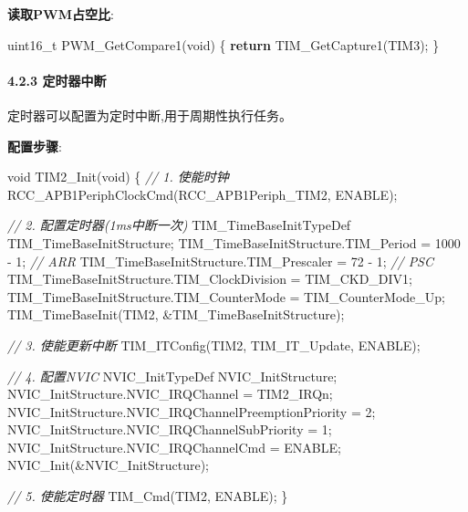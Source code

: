 \documentclass[
]{article}
\newenvironment{Shaded}{}{}
\newcommand{\CommentTok}[1]{\textcolor[rgb]{0.38,0.63,0.69}{\textit{#1}}}
\newcommand{\ControlFlowTok}[1]{\textcolor[rgb]{0.00,0.44,0.13}{\textbf{#1}}}
\newcommand{\DataTypeTok}[1]{\textcolor[rgb]{0.56,0.13,0.00}{#1}}
\newcommand{\DecValTok}[1]{\textcolor[rgb]{0.25,0.63,0.44}{#1}}
\newcommand{\NormalTok}[1]{#1}
\begin{document}
\textbf{读取PWM占空比}:

\begin{Shaded}
\begin{Highlighting}[]
\DataTypeTok{uint16\_t}\NormalTok{ PWM\_GetCompare1(}\DataTypeTok{void}\NormalTok{)}
\NormalTok{\{}
    \ControlFlowTok{return}\NormalTok{ TIM\_GetCapture1(TIM3);}
\NormalTok{\}}
\end{Highlighting}
\end{Shaded}

\hypertarget{ux5b9aux65f6ux5668ux4e2dux65ad}{%
\paragraph{4.2.3 定时器中断}\label{ux5b9aux65f6ux5668ux4e2dux65ad}}

定时器可以配置为定时中断,用于周期性执行任务。

\textbf{配置步骤}:

\begin{Shaded}
\begin{Highlighting}[]
\DataTypeTok{void}\NormalTok{ TIM2\_Init(}\DataTypeTok{void}\NormalTok{)}
\NormalTok{\{}
    \CommentTok{// 1. 使能时钟}
\NormalTok{    RCC\_APB1PeriphClockCmd(RCC\_APB1Periph\_TIM2, ENABLE);}
    
    \CommentTok{// 2. 配置定时器(1ms中断一次)}
\NormalTok{    TIM\_TimeBaseInitTypeDef TIM\_TimeBaseInitStructure;}
\NormalTok{    TIM\_TimeBaseInitStructure.TIM\_Period = }\DecValTok{1000}\NormalTok{ {-} }\DecValTok{1}\NormalTok{;        }\CommentTok{// ARR}
\NormalTok{    TIM\_TimeBaseInitStructure.TIM\_Prescaler = }\DecValTok{72}\NormalTok{ {-} }\DecValTok{1}\NormalTok{;       }\CommentTok{// PSC}
\NormalTok{    TIM\_TimeBaseInitStructure.TIM\_ClockDivision = TIM\_CKD\_DIV1;}
\NormalTok{    TIM\_TimeBaseInitStructure.TIM\_CounterMode = TIM\_CounterMode\_Up;}
\NormalTok{    TIM\_TimeBaseInit(TIM2, \&TIM\_TimeBaseInitStructure);}
    
    \CommentTok{// 3. 使能更新中断}
\NormalTok{    TIM\_ITConfig(TIM2, TIM\_IT\_Update, ENABLE);}
    
    \CommentTok{// 4. 配置NVIC}
\NormalTok{    NVIC\_InitTypeDef NVIC\_InitStructure;}
\NormalTok{    NVIC\_InitStructure.NVIC\_IRQChannel = TIM2\_IRQn;}
\NormalTok{    NVIC\_InitStructure.NVIC\_IRQChannelPreemptionPriority = }\DecValTok{2}\NormalTok{;}
\NormalTok{    NVIC\_InitStructure.NVIC\_IRQChannelSubPriority = }\DecValTok{1}\NormalTok{;}
\NormalTok{    NVIC\_InitStructure.NVIC\_IRQChannelCmd = ENABLE;}
\NormalTok{    NVIC\_Init(\&NVIC\_InitStructure);}
    
    \CommentTok{// 5. 使能定时器}
\NormalTok{    TIM\_Cmd(TIM2, ENABLE);}
\NormalTok{\}}
\end{Highlighting}
\end{Shaded}
\end{document}
